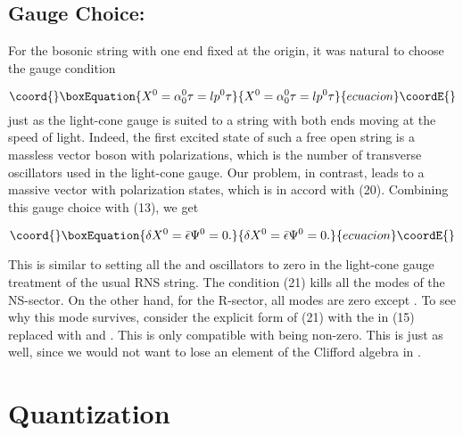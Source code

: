 \documentclass[a4paper,a4paper]{article}
\begin{document}
\subsection{Gauge Choice:}

For the bosonic string with one end fixed at the origin, it was
natural to choose the gauge condition

\begin{equation}\coord{}\boxEquation{
X^{0}=\alpha_{0}^{0}\tau =lp^0 \tau
}{
X^{0}=\alpha_{0}^{0}\tau =lp^0 \tau
}{ecuacion}\coordE{}\end{equation}
just as the light-cone gauge \coordHE{} is suited to a string
with both ends moving at the speed of light.  Indeed, the first
excited state of such a free open string is a massless vector
boson with \coordHE{} polarizations, which is the number of transverse
oscillators used in the light-cone gauge. Our problem, in
contrast, leads to a massive vector with \coordHE{} polarization
states, which is in accord with (20). Combining this gauge choice
with (13), we get

\begin{equation}\coord{}\boxEquation{ \delta X^{0}=\bar{\epsilon} \Psi^{0}=0.
}{ \delta X^{0}=\bar{\epsilon} \Psi^{0}=0.
}{ecuacion}\coordE{}\end{equation}

This is similar to setting all the \myHighlight{$\Psi^{+}$}\coordHE{} and \coordHE{}
oscillators to zero in the light-cone gauge treatment of the usual
RNS string.  The condition (21) kills all the \coordHE{} modes of
the NS-sector.  On the other hand, for the R-sector, all
\coordHE{} modes are zero except \coordHE{}. To see why this mode
survives, consider the explicit form of (21) with the \coordHE{} in
(15) replaced with \coordHE{} and \myHighlight{$\epsilon_+ = \epsilon_-$}\coordHE{}.  This
is only compatible with \coordHE{} being non-zero.  This is just
as well, since we would not want to lose an element of the
Clifford algebra in \coordHE{}.

\section{Quantization}
\end{document}

